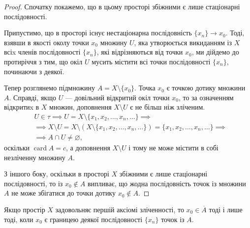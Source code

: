 \documentclass[a4paper, 12pt]{article}
\renewcommand{\emptyset}{\varnothing}
\DeclareMathOperator{\card}{card}
\begin{document}
\begin{proof}
	Спочатку покажемо, що в цьому просторі збіжними є
	лише стаціонарні послідовності. \smallskip

	Припустимо, що в просторі
	існує нестаціонарна послідовність $\{x_n\} \to x_0$. Тоді, взявши в
	якості околу точки $x_0$ множину $U$, яка утворюється
	викиданням із $X$ всіx членів послідовності $\{x_n\}$, які
	відрізняються від точки $x_0$, ми дійдемо до протиріччя з тим,
	що окіл $U$ мусить містити всі точки послідовності $\{x_n\}$,
	починаючи з деякої. \smallskip

	Тепер розглянемо підмножину $A = X \setminus \{x_0\}$. Точка $x_0$ є
	точкою дотику множини $A$. Справді, якщо $U$ --- довільний
	відкритий окіл точки $x_0$, то за означенням відкритиx в $X$
	множин, доповнення $X \setminus U$ є не більш ніж зліченим.
	\begin{align*}
		& U \in \tau \implies U = X \setminus \{ x_1, x_2, \ldots, x_n, \ldots \} \implies \\
		& \implies X \setminus U = X \setminus (X \setminus \{ x_1, x_2, \ldots, x_n, \ldots \}) = \{ x_1, x_2, \ldots, x_n, \ldots \} \implies \\
		& \implies A \cap U \ne \emptyset,
	\end{align*}
	оскільки $\card A = c$, а доповнення $X \setminus U$ і
	тому не може містити в собі незліченну множину $A$. \smallskip

	З іншого боку, оскільки в просторі $X$ збіжними є лише
	стаціонарні послідовності, то із $x_0 \notin A$ випливає, що жодна
	послідовність точок із множини $A$ не може збігатися до
	точки дотику $x_0 \notin A$.
\end{proof}

\begin{theorem}
	Якщо простір $X$ задовольняє першій аксіомі
	зліченності, то $x_0 \in \overline{A}$ тоді і лише тоді, коли $x_0$ є границею
	деякої послідовності $\{x_n\}$ точок із $A$.
\end{theorem}
\end{document}
